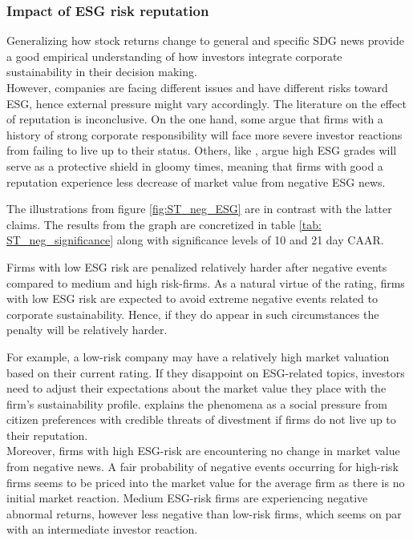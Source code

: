 \subsubsection{Impact of ESG risk reputation}

Generalizing how stock returns change to general and specific SDG news provide a good empirical understanding of how investors integrate corporate sustainability in their decision making. \\
However, companies are facing different issues and have different risks toward ESG, hence external pressure might vary accordingly. The literature on the effect of reputation is inconclusive.
On the one hand, some argue that firms with a history of strong corporate responsibility will face more severe investor reactions from failing to live up to their status. Others, like \cite{flammer2013corporate}, argue high ESG grades will serve as a protective shield in gloomy times, meaning that firms with good a reputation experience less decrease of market value from negative ESG news. 

The illustrations from figure \ref{fig:ST_neg_ESG} are in contrast with the latter claims. The results from the graph are concretized in table \ref{tab: ST_neg_significance} along with significance levels of 10 and 21 day CAAR. 

Firms with low ESG risk are penalized relatively harder after negative events compared to medium and high risk-firms. As a natural virtue of the rating, firms with low ESG risk are expected to avoid extreme negative events related to corporate sustainability. Hence, if they do appear in such circumstances the penalty will be relatively harder.

For example, a low-risk company may have a relatively high market valuation based on their current rating. If they disappoint on ESG-related topics, investors need to adjust their expectations about the market value they place with the firm's sustainability profile. \cite{baron2009positive} explains the phenomena as a social pressure from citizen preferences with credible threats of divestment if firms do not live up to their reputation. \\ 
Moreover, firms with high ESG-risk are encountering no change in market value from negative news. A fair probability of negative events occurring for high-risk firms seems to be priced into the market value for the average firm as there is no initial market reaction. Medium ESG-risk firms are experiencing negative abnormal returns, however less negative than low-risk firms, which seems on par with an intermediate investor reaction.   

